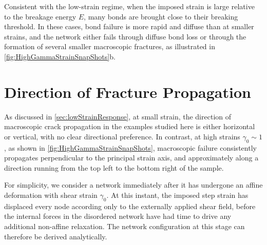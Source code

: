 Consistent with the low-strain regime, when the imposed strain is large relative to the breakage energy $E$, many bonds are brought close to their breaking threshold. In these cases, bond failure is more rapid and diffuse than at smaller strains, and the network either fails through diffuse bond loss or through the formation of several smaller macroscopic fractures, as illustrated in \cref{fig:HighGammaStrainSnapShots}b.

\section{Direction of Fracture Propagation} \label{sec:DirectionOfFracture}

As discussed in \cref{sec:lowStrainResponse}, at small strain, the direction of macroscopic crack propagation in the examples studied here is either horizontal or vertical, with no clear directional preference. In contrast, at high strains $\gamma_0\sim 1$, as shown in \cref{fig:HighGammaStrainSnapShots}, macroscopic failure consistently propagates perpendicular to the principal strain axis, and approximately along a direction running from the top left to the bottom right of the sample.

For simplicity, we consider a network immediately after it has undergone an affine deformation with shear strain $\gamma_0$. At this instant, the imposed step strain has displaced every node according only to the externally applied shear field, before the internal forces in the disordered network have had time to drive any additional non-affine relaxation. The network configuration at this stage can therefore be derived analytically.

